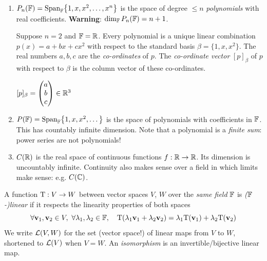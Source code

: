 \begin{examples*}{}{}
\begin{enumerate}[resume]
    \item $P_n(\mathbb{F})=\operatorname{Span}_{\mathbb{F}}\bigl\{1,x,x^2,\ldots,x^n\big\}$ is the space of degree $\le n$ \emph{polynomials} with real coefficients. \textbf{Warning}: $\dim_{\mathbb{F}}P_n(\mathbb{F})=n+1$.\par
    \begin{minipage}[t]{0.77\linewidth}\vspace{-5pt}
    	Suppose $n=2$ and $\mathbb{F}=\mathbb{R}$. Every polynomial is a unique linear combination $p(x)=a+bx+cx^2$ with respect to the standard basis $\beta=\{1,x,x^2\}$. The real numbers $a,b,c$ are the \emph{co-ordinates} of $p$. The \emph{co-ordinate vector} $[p]_\beta$ of $p$ with respect to $\beta$ is the column vector of these co-ordinates.
    \end{minipage}
    \hfill
    \begin{minipage}[t]{0.2\linewidth}\vspace{-5pt}
     	\hfill$[p]_\beta=\begin{pmatrix}a\\b\\c\end{pmatrix} \in\mathbb{R}^3$
    \end{minipage}

    \item $P(\mathbb{F})=\operatorname{Span}_{\mathbb{F}}\bigl\{1,x,x^2,\ldots\big\}$ is the space of polynomials with coefficients in $\mathbb{F}$. This has countably infinite dimension. Note that a polynomial is a \emph{finite sum}: power series are not polynomials! 
    
    \item $C(\mathbb{R})$ is the real space of continuous functions $f:\mathbb{R}\to\mathbb{R}$. Its dimension is uncountably infinite. Continuity also makes sense over a field in which limits make sense: e.g. $C(\mathbb{C})$.
  \end{enumerate}
\end{examples*}
  



A function $\mathrm{T}:V\to W$ between vector spaces $V$, $W$ over the \emph{same field} $\mathbb{F}$ is \emph{($\mathbb{F}$-)linear} if it respects the linearity properties of both spaces
\[
	\forall {\mathbf{v}}_1,{\mathbf{v}}_2\in V,\ \forall \lambda_1,\lambda_2\in\mathbb{F},\quad 	\mathrm{T}(\lambda_1{\mathbf{v}}_1+\lambda_2{\mathbf{v}}_2)=\lambda_1\mathrm{T}({\mathbf{v}}_1)+\lambda_2\mathrm{T}({\mathbf{v}}_2)
\]
We write $\mathcal{L}(V,W)$ for the set (vector space!) of linear maps from $V$ to $W$, shortened to $\mathcal{L}(V)$ when $V=W$. An \emph{isomorphism} is an invertible/bijective linear map.

